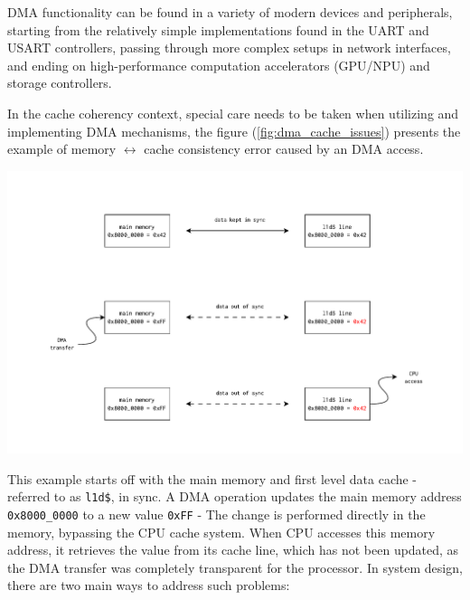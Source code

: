 \noindent DMA functionality can be found in a variety of modern devices and
peripherals, starting from the relatively simple implementations found in the
UART and USART controllers, passing through more complex setups in network %
interfaces, and ending on high-performance computation accelerators (GPU/NPU)
and storage controllers.

\noindent In the cache coherency context, special care needs to be %
taken when utilizing and implementing DMA mechanisms, the figure
(\ref{fig:dma_cache_issues}) presents the example of memory $\leftrightarrow$
cache consistency error caused by an DMA access.

\begin{center}
	\centering
	\includegraphics[width=\textwidth]{figures/02-background/dma_cache_issues.pdf}
	\label{fig:dma_cache_issues}
\end{center}

\noindent This example starts off with the main memory and first level data cache - referred to as \texttt{l1d\$}, in sync.
A DMA operation updates the main memory address \texttt{0x8000\_0000} to a new value \texttt{0xFF} - The change is performed directly
in the memory, bypassing the CPU cache system. When CPU accesses this memory address, it retrieves the value from its
cache line, which has not been updated, as the DMA transfer was completely transparent for the processor.
In system design, there are two main ways to address such problems:

